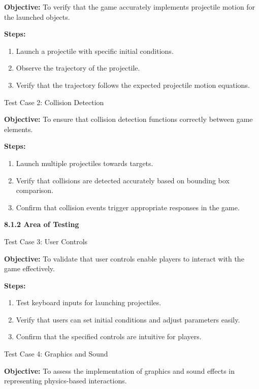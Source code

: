 \documentclass[
]{article}
\begin{document}
\textbf{Objective:} To verify that the game accurately implements
projectile motion for the launched objects.

\textbf{Steps:}

\begin{enumerate}
\def\labelenumi{\arabic{enumi}.}
\item
  Launch a projectile with specific initial conditions.
\item
  Observe the trajectory of the projectile.
\item
  Verify that the trajectory follows the expected projectile motion
  equations.
\end{enumerate}

Test Case 2: Collision Detection

\textbf{Objective:} To ensure that collision detection functions
correctly between game elements.

\textbf{Steps:}

\begin{enumerate}
\def\labelenumi{\arabic{enumi}.}
\item
  Launch multiple projectiles towards targets.
\item
  Verify that collisions are detected accurately based on bounding box
  comparison.
\item
  Confirm that collision events trigger appropriate responses in the
  game.
\end{enumerate}

\textbf{8.1.2 Area of Testing}

Test Case 3: User Controls

\textbf{Objective:} To validate that user controls enable players to
interact with the game effectively.

\textbf{Steps:}

\begin{enumerate}
\def\labelenumi{\arabic{enumi}.}
\item
  Test keyboard inputs for launching projectiles.
\item
  Verify that users can set initial conditions and adjust parameters
  easily.
\item
  Confirm that the specified controls are intuitive for players.
\end{enumerate}

Test Case 4: Graphics and Sound

\textbf{Objective:} To assess the implementation of graphics and sound
effects in representing physics-based interactions.
\end{document}
